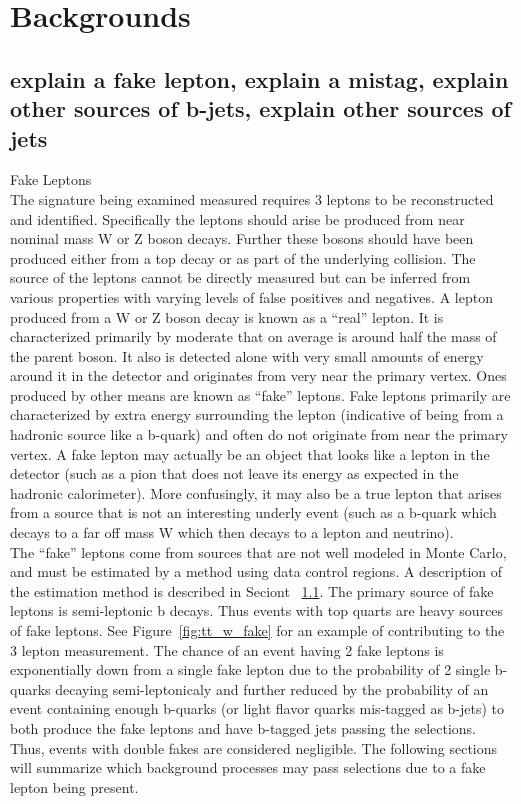 	\section{Backgrounds}
		\subsection{explain a fake lepton, explain a mistag, explain other sources of b-jets, explain other sources of jets}
		Fake Leptons\\
		The \ttZ signature being examined measured requires 3 leptons to be reconstructed and identified. Specifically the leptons should arise be produced from near nominal mass W or Z boson decays. Further these bosons should have been produced either from a top decay or as part of the underlying collision. The source of the leptons cannot be directly measured but can be inferred from various properties with varying levels of false positives and negatives. A lepton produced from a W or Z boson decay is known as a ``real'' lepton. It is characterized primarily by moderate \pt that on average is around half the mass of the parent boson. It also is detected alone with very small amounts of energy around it in the detector and originates from very near the primary vertex. Ones produced by other means are known as ``fake'' leptons. Fake leptons primarily are characterized by extra energy surrounding the lepton (indicative of being from a hadronic source like a b-quark) and often do not originate from near the primary vertex. A fake lepton may actually be an object that looks like a lepton in the detector (such as a pion that does not leave its energy as expected in the hadronic calorimeter). More confusingly, it may also be a true lepton that arises from a source that is not an interesting underly event (such as a b-quark which decays to a far off mass W which then decays to a lepton and neutrino).\\
		
		The ``fake'' leptons come from sources that are not well modeled in Monte Carlo, and must be estimated by a method using data control regions. A description of the estimation method is described in Seciont ~\ref{}. The primary source of fake leptons is semi-leptonic b decays. Thus events with top quarts are heavy sources of fake leptons. See Figure~\ref{fig:tt_w_fake} for an example of \ttbar contributing to the 3 lepton measurement. The chance of an event having 2 fake leptons is exponentially down from a single fake lepton due to the probability of 2 single b-quarks decaying semi-leptonicaly and further reduced by the probability of an event containing enough b-quarks (or light flavor quarks mis-tagged as b-jets) to both produce the fake leptons and have b-tagged jets passing the selections. Thus,  events with double fakes are considered negligible. The following sections will summarize which background processes may pass selections due to a fake lepton being present.\\
		

